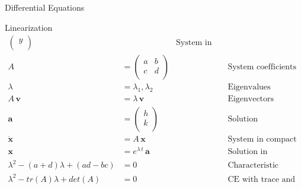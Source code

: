 \begin{section}{Differential Equations}
\begin{subsection}{Linearization}
\begin{align*}
\begin{pmatrix}
        y \\
      \end{pmatrix}
      && \text{System in matrix form}\\
      A &=
      \begin{pmatrix}
        a & b \\
        c & d \\
      \end{pmatrix}
      && \text{System coefficients}\\
      \lambda &= \lambda_1 , \lambda_2 && \text{Eigenvalues}\\
      A\,\mathbf{v} &= \lambda\,\mathbf{v} &&  \text{Eigenvectors}\\
      \mathbf{a} &=
      \begin{pmatrix}
        h \\
        k \\
      \end{pmatrix}
      && \text{Solution coefficients}\\
     \dot{\mathbf{x}} &= A\,\mathbf{x} && \text{System in compact form} \\
     \mathbf{x} &= e^{\lambda\,t}\,\mathbf{a}
     && \text{Solution in compact form} \\
     \lambda^2 - (a+d)\lambda + (ad - bc) &= 0
     && \text{Characteristic Equation (CE)} \\
     \lambda^2 - tr(A)\lambda + det(A) &= 0
     && \text{CE with trace and determinant} \\
    \end{align*}
  \end{subsection}
\end{section}
